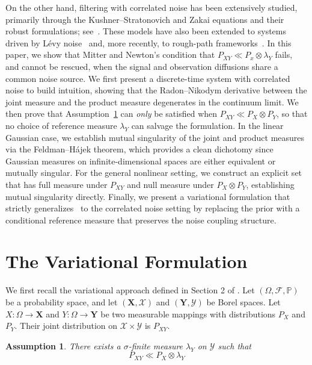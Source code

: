 \documentclass[12pt]{amsart}
\newtheorem{assumption}[theorem]{Assumption}
\theoremstyle{definition}
\theoremstyle{remark}
\newcommand{\ms}[1]{(\mathbf{#1},\mathcal{#1})}
\begin{document}
 On the other hand, filtering with correlated noise has been extensively studied, primarily through the Kushner–Stratonovich and Zakai equations and their robust formulations; see~\cite{clark1978design, elliott1981robust, davis1987pathwise, crisanrough}. These models have also been extended to systems driven by L\'evy noise~\cite{qiaouncorr, qiaocorr} and, more recently, to rough-path frameworks~\cite{allan2025rough,srinivasan2026robust}. In this paper, we show that Mitter and Newton's condition that $P_{XY} \ll P_x \otimes \lambda_Y$ fails, and cannot be rescued, when the signal and observation diffusions share a common noise source. We first present a discrete-time system with correlated noise to build intuition, showing that the Radon–Nikodym derivative between the joint measure and the product measure degenerates in the continuum limit. We then prove that Assumption~\ref{as: H1} can \emph{only} be satisfied when $P_{XY} \ll P_X \otimes P_Y$, so that no choice of reference measure $\lambda_Y$
 can salvage the formulation. In the linear Gaussian case, we establish mutual singularity of the joint and product measures via the Feldman–H\'ajek theorem, which provides a clean dichotomy since Gaussian measures on infinite-dimensional spaces are either equivalent or mutually singular. For the general nonlinear setting, we construct an explicit set that has full measure under $P_{XY}$ and null measure under $P_X \otimes P_Y$, establishing mutual singularity directly. Finally, we present a variational formulation that strictly generalizes~\cite{mitter2003variational} to the correlated noise setting by replacing the prior with a conditional reference measure that preserves the noise coupling structure.

\section{The Variational Formulation}

We first recall the variational approach defined in Section 2 of \cite{mitter2003variational}. Let $(\Omega,\mathcal{F},\mathbb{P})$ be a probability space, and let $\ms{X}$ and $\ms{Y}$ be Borel spaces. Let $X:\Omega\to\mathbf{X}$ and $Y:\Omega\to\mathbf{Y}$ be two measurable mappings with distributions $P_X$ and $P_Y$. Their joint distribution on $\mathcal{X\times Y}$ is $P_{XY}$.
\begin{assumption}\label{as: H1}
    There exists a $\sigma$-finite measure $\lambda_Y$ on $\mathcal{Y}$ such that
    \begin{equation*}
        P_{XY}\ll P_X\otimes\lambda_Y
    \end{equation*}
\end{assumption}
\end{document}
